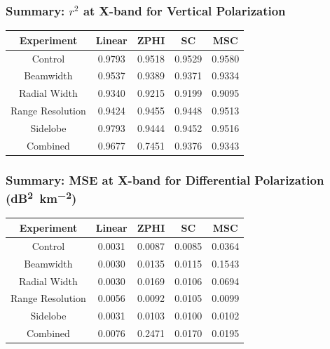 \documentclass[red]{beamer}
\begin{document}
\begin{frame}
    \frametitle{Summary: $r^2$ at X-band for Vertical Polarization}
    \begin{center}
        \begin{tabular}{| c | c | c | c | c |}
            \hline
            Experiment & Linear & ZPHI & SC & MSC \\
            \hline
            \hline
            Control & 0.9793 & 0.9518 & 0.9529 & 0.9580 \\
            Beamwidth & 0.9537 & 0.9389 & 0.9371 & 0.9334 \\
            Radial Width & 0.9340 & 0.9215 & 0.9199 & 0.9095 \\
            Range Resolution & 0.9424 & 0.9455 & 0.9448 & 0.9513 \\
            Sidelobe & 0.9793 & 0.9444 & 0.9452 & 0.9516 \\
            Combined & 0.9677 & 0.7451 & 0.9376 & 0.9343 \\
            \hline
        \end{tabular}
    \end{center}
\end{frame}

\begin{frame}
    \frametitle{Summary: MSE at X-band for Differential Polarization (\si{dB\squared\per \kilo\meter\squared})}
    \begin{center}
        \begin{tabular}{| c | c | c | c | c |}
            \hline
            Experiment & Linear & ZPHI & SC & MSC \\
            \hline
            \hline
            Control & 0.0031 & 0.0087 & 0.0085 & 0.0364 \\
            Beamwidth & 0.0030 & 0.0135 & 0.0115 & 0.1543 \\
            Radial Width & 0.0030 & 0.0169 & 0.0106 & 0.0694 \\
            Range Resolution & 0.0056 & 0.0092 & 0.0105 & 0.0099 \\
            Sidelobe & 0.0031 & 0.0103 & 0.0100 & 0.0102 \\
            Combined & 0.0076 & 0.2471 & 0.0170 & 0.0195 \\
            \hline
        \end{tabular}
    \end{center}
\end{frame}
\end{document}
